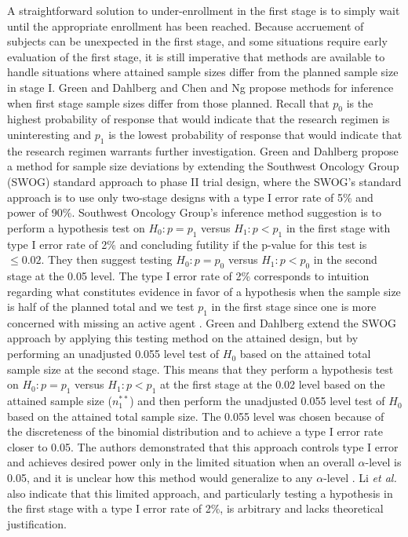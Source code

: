 \documentclass[12pt]{report}\usepackage[]{graphicx}\usepackage[]{color}
\newlength{\li}\setlength{\li}{14.48pt}
\newlength{\di}\setlength{\di}{-3.5mm}
\begin{document}
\indent A straightforward solution to under-enrollment in the first stage is to simply wait until the appropriate enrollment has been reached. Because accruement of subjects can be unexpected in the first stage, and some situations require early evaluation of the first stage, it is still imperative that methods are available to handle situations where attained sample sizes differ from the planned sample size in stage I. Green and Dahlberg \cite{Green} and Chen and Ng \cite{Chen} propose methods for inference when first stage sample sizes differ from those planned. Recall that $p_0$ is the highest probability of response that would indicate that the research regimen is uninteresting and $p_1$ is the lowest probability of response that would indicate that the research regimen warrants further investigation. Green and Dahlberg propose a method for sample size deviations by extending the Southwest Oncology Group (SWOG) standard approach to phase II trial design, where the SWOG's standard approach is to use only two-stage designs with a type I error rate of 5\% and power of 90\%. Southwest Oncology Group's inference method suggestion is to perform a hypothesis test on $H_0: p=p_1$ versus $H_1: p < p_1$ in the first stage with type I error rate of 2\% and concluding futility if the p-value for this test is $\leq 0.02$. They then suggest testing $H_0: p=p_0$ versus $H_1: p < p_0$ in the second stage at the 0.05 level. The type I error rate of 2\% corresponds to intuition regarding what constitutes evidence in favor of a hypothesis when the sample size is half of the planned total and we test $p_1$ in the first stage since one is more concerned with missing an active agent \cite{Green}. Green and Dahlberg extend the SWOG approach by applying this testing method on the attained design, but by performing an unadjusted 0.055 level test of $H_0$ based on the attained total sample size at the second stage. This means that they perform a hypothesis test on $H_0: p=p_1$ versus $H_1: p < p_1$ at the first stage at the 0.02 level based on the attained sample size ($n_1^{\ast\ast}$) and then perform the unadjusted 0.055 level test of $H_0$ based on the attained total sample size. \cite{Green} The 0.055 level was chosen because of the discreteness of the binomial distribution and to achieve a type I error rate closer to 0.05. The authors demonstrated that this approach controls type I error and achieves desired power only in the limited situation when an overall $\alpha$-level is 0.05, and it is unclear how this method would generalize to any $\alpha$-level \cite{Li}. Li \textit{et al.} also indicate that this limited approach, and particularly testing a hypothesis in the first stage with a type I error rate of 2\%, is arbitrary and lacks theoretical justification.  \\
\end{document}
